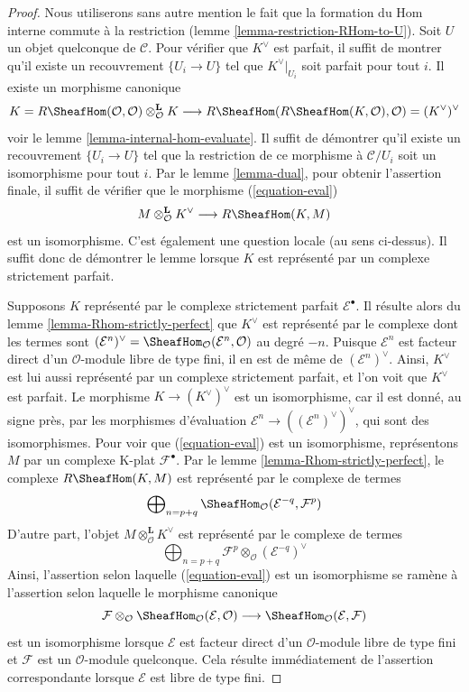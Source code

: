\begin{proof}
Nous utiliserons sans autre mention le fait que la formation du Hom interne
commute à la restriction (lemme \ref{lemma-restriction-RHom-to-U}). Soit $U$
un objet quelconque de $\mathcal{C}$. Pour vérifier que $K^\vee$ est parfait,
il suffit de montrer qu'il existe un recouvrement $\{U_i \to U\}$ tel que
$K^\vee|_{U_i}$ soit parfait pour tout $i$. Il existe un morphisme canonique
$$
K = R\SheafHom(\mathcal{O}, \mathcal{O})
\otimes_{\mathcal{O}}^\mathbf{L} K \longrightarrow
R\SheafHom(R\SheafHom(K, \mathcal{O}), \mathcal{O}) =
(K^\vee)^\vee
$$
voir le lemme \ref{lemma-internal-hom-evaluate}. Il suffit de démontrer qu'il
existe un recouvrement $\{U_i \to U\}$ tel que la restriction de ce morphisme
à $\mathcal{C}/U_i$ soit un isomorphisme pour tout $i$. Par le lemme
\ref{lemma-dual}, pour obtenir l'assertion finale, il suffit de vérifier que
le morphisme (\ref{equation-eval})
$$
M \otimes^\mathbf{L}_\mathcal{O} K^\vee
\longrightarrow
R\SheafHom(K, M)
$$
est un isomorphisme. C'est également une question locale (au sens ci-dessus).
Il suffit donc de démontrer le lemme lorsque $K$ est représenté par un
complexe strictement parfait.

\medskip\noindent
Supposons $K$ représenté par le complexe strictement parfait
$\mathcal{E}^\bullet$. Il résulte alors du lemme
\ref{lemma-Rhom-strictly-perfect} que $K^\vee$ est représenté par le complexe
dont les termes sont
$(\mathcal{E}^n)^\vee =
\SheafHom_\mathcal{O}(\mathcal{E}^n, \mathcal{O})$
au degré $-n$. Puisque $\mathcal{E}^n$ est facteur direct d'un
$\mathcal{O}$-module libre de type fini, il en est de même de
$(\mathcal{E}^n)^\vee$. Ainsi, $K^\vee$ est lui aussi représenté par un
complexe strictement parfait, et l'on voit que $K^\vee$ est parfait. Le
morphisme $K \to (K^\vee)^\vee$ est un isomorphisme, car il est donné, au
signe près, par les morphismes d'évaluation
$\mathcal{E}^n \to ((\mathcal{E}^n)^\vee)^\vee$, qui sont des isomorphismes.
Pour voir que (\ref{equation-eval}) est un isomorphisme, représentons $M$ par
un complexe K-plat $\mathcal{F}^\bullet$. Par le lemme
\ref{lemma-Rhom-strictly-perfect}, le complexe $R\SheafHom(K, M)$ est
représenté par le complexe de termes
$$
\bigoplus\nolimits_{n = p + q}
\SheafHom_\mathcal{O}(\mathcal{E}^{-q}, \mathcal{F}^p)
$$
D'autre part, l'objet $M \otimes^\mathbf{L}_\mathcal{O} K^\vee$ est
représenté par le complexe de termes
$$
\bigoplus\nolimits_{n = p + q}
\mathcal{F}^p \otimes_\mathcal{O} (\mathcal{E}^{-q})^\vee
$$
Ainsi, l'assertion selon laquelle (\ref{equation-eval}) est un isomorphisme se
ramène à l'assertion selon laquelle le morphisme canonique
$$
\mathcal{F}
\otimes_\mathcal{O}
\SheafHom_\mathcal{O}(\mathcal{E}, \mathcal{O})
\longrightarrow
\SheafHom_\mathcal{O}(\mathcal{E}, \mathcal{F})
$$
est un isomorphisme lorsque $\mathcal{E}$ est facteur direct d'un
$\mathcal{O}$-module libre de type fini et $\mathcal{F}$ est un
$\mathcal{O}$-module quelconque. Cela résulte immédiatement de l'assertion
correspondante lorsque $\mathcal{E}$ est libre de type fini.
\end{proof}

